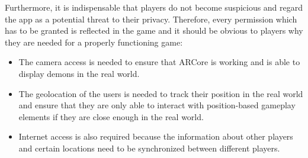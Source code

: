 
Furthermore, it is indispensable that players do not become suspicious and regard the app as a potential threat to their privacy.
Therefore, every permission which has to be granted is reflected in the game and it should be obvious to players why they are needed for a properly functioning game:
\begin{itemize}
    \item The camera access is needed to ensure that ARCore is working and is able to display demons in the real world.
    \item The geolocation of the users is needed to track their position in the real world and ensure that they are only able to interact with position-based gameplay elements if they are close enough in the real world. 
    \item Internet access is also required because the information about other players and certain locations need to be synchronized between different players.
\end{itemize}

